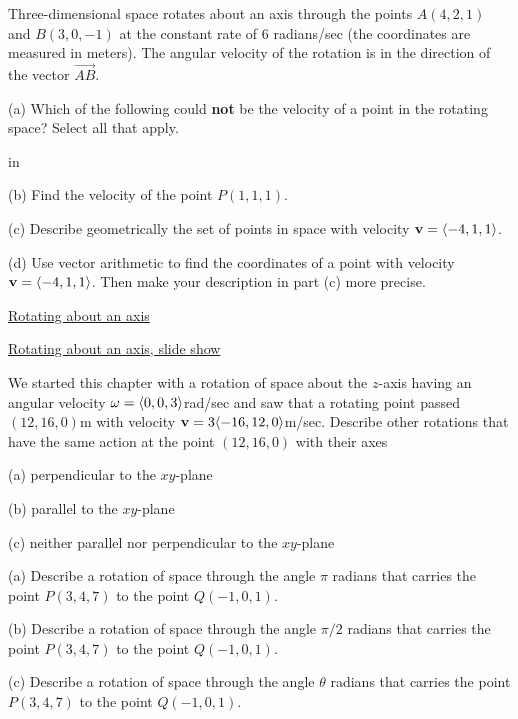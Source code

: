 \documentclass{ximera}
\newcommand{\pskip}{\vskip 0.1 in}
\begin{document}
\begin{question} \label{Qgdsnt:Cross}
Three-dimensional space rotates about an axis through the points $A(4,2,1)$ and $B(3,0,-1)$ at the constant rate of $6$ radians/sec (the coordinates are measured in meters). The angular velocity of the rotation is in the direction of the vector $\overrightarrow{AB}$. 

(a) Which of the following could {\bf not} be the velocity of a point in the rotating space? Select all that apply.

\begin{selectAll}  
  \end{selectAll}  


\pskip

(b) Find the velocity of the point $P(1,1,1)$.

(c) Describe geometrically the set of points in space with velocity ${\bf v} =\langle -4,1,1 \rangle$.

(d) Use vector arithmetic to find the coordinates of a point with velocity ${\bf v} =\langle -4,1,1 \rangle$. Then make your description in part (c) more precise.

\end{question}


\begin{exploration}



\href{https://www.desmos.com/3d/31f1fd3ffd}{Rotating about an axis}


\href{https://www.desmos.com/3d/a82ef238da}{Rotating about an axis, slide show}


\end{exploration}



\begin{question}  \label{Q3254hv:Cross}
We started this chapter with a rotation of space about the $z$-axis having an angular velocity ${\bf \omega} = \langle 0,0,3 \rangle$rad/sec and saw that a rotating point passed $(12,16,0)$m with velocity ${\bf v}= 3\langle -16,12,0\rangle$m/sec. Describe other rotations that have the same action at the point $(12,16,0)$ with their axes

(a) perpendicular to the $xy$-plane

(b) parallel to the $xy$-plane

(c) neither parallel nor perpendicular to the $xy$-plane
 
\end{question}


\begin{question}  \label{Qdsftr54hv:Cross}
(a) Describe a rotation of space through the angle $\pi$ radians that carries the point $P(3,4,7)$ to the point $Q(-1,0,1)$.

(b) Describe a rotation of space through the angle $\pi/2$ radians that carries the point $P(3,4,7)$ to the point $Q(-1,0,1)$.

(c) Describe a rotation of space through the angle $\theta$ radians that carries the point $P(3,4,7)$ to the point $Q(-1,0,1)$.
\end{question}
\end{document}
